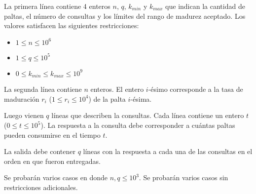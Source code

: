 \documentclass{oci}
\begin{document}
\begin{inputDescription}

La primera línea contiene 4 enteros
$n$, $q$, $k_{min}$ y $k_{max}$
que indican la cantidad de paltas, el número de consultas y los límites del rango de madurez aceptado.
Los valores satisfacen las siguientes restricciones:

\begin{itemize}
  \item $1 \leq n \leq 10^6$
  \item $1 \leq q \leq 10^5$
  \item $0 \leq k_{min} \leq k_{max} \leq 10^9$
\end{itemize}

La segunda línea contiene $n$ enteros.
El entero $i$-ésimo corresponde a la tasa de maduración $r_i$ ($1 \leq r_i \leq 10^4$)
de la palta $i$-ésima.

Luego vienen $q$ líneas que describen la consultas.
Cada línea contiene un entero $t$ ($0 \leq t \leq 10^5$).
La respuesta a la consulta debe corresponder a cuántas paltas pueden consumirse
en el tiempo $t$.

\end{inputDescription}

\begin{outputDescription}
La salida debe contener $q$ líneas con la respuesta a cada una de las consultas en el orden en que
fueron entregadas.
\end{outputDescription}

\begin{scoreDescription}
  Se probarán varios casos en donde $n, q \leq 10^3$.
  Se probarán varios casos sin restricciones adicionales.
\end{scoreDescription}
\end{document}
